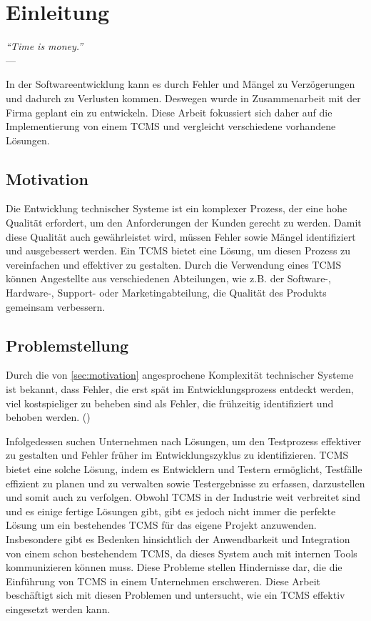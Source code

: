 \documentclass[a4paper, fontsize=11pt, parskip=half, twoside]{scrreprt}
\begin{document}
	
	
	\clearpage
	\chapter{Einleitung}
	
	\begin{flushright}
		\rightskip=8cm\textit{``Time is money.''} \\
		\vspace{.2em}
		\rightskip=6cm--- \textcite{franklin_advice_1748}
	\end{flushright}

	In der Softwareentwicklung kann es durch Fehler und Mängel zu Verzögerungen und dadurch zu Verlusten kommen.
	Deswegen wurde in Zusammenarbeit mit der Firma  geplant ein  zu entwickeln.
	Diese Arbeit fokussiert sich daher auf die Implementierung von einem \ac{TCMS} und vergleicht verschiedene vorhandene Lösungen.
	
	
	\section{Motivation} \label{sec:motivation}
	Die Entwicklung technischer Systeme ist ein komplexer Prozess, der eine hohe Qualität erfordert, um den Anforderungen der Kunden gerecht zu werden. 
	Damit diese Qualität auch gewährleistet wird, müssen Fehler sowie Mängel identifiziert und ausgebessert werden. 
	Ein \ac{TCMS} bietet eine Lösung, um diesen Prozess zu vereinfachen und effektiver zu gestalten. 
	Durch die Verwendung eines \ac{TCMS} können Angestellte aus verschiedenen Abteilungen, wie z.B. der Software-, Hardware-, Support- oder Marketingabteilung, die Qualität des Produkts gemeinsam verbessern. 
	
	\section{Problemstellung}
	Durch die von \autoref{sec:motivation} angesprochene Komplexität technischer Systeme ist bekannt, dass Fehler, die erst spät im Entwicklungsprozess entdeckt werden, viel kostspieliger zu beheben sind als Fehler, die frühzeitig identifiziert und behoben werden. (\textcite{westland_cost_2002})
	
	Infolgedessen suchen Unternehmen nach Lösungen, um den Testprozess effektiver zu gestalten und Fehler früher im Entwicklungszyklus zu identifizieren. 
	\ac{TCMS} bietet eine solche Lösung, indem es Entwicklern und Testern ermöglicht, Testfälle effizient zu planen und zu verwalten sowie Testergebnisse zu erfassen, darzustellen und somit auch zu verfolgen. 
	Obwohl \ac{TCMS} in der Industrie weit verbreitet sind und es einige fertige Lösungen gibt, gibt es jedoch nicht immer die perfekte Lösung um ein bestehendes \ac{TCMS} für das eigene Projekt anzuwenden. 
	Insbesondere gibt es Bedenken hinsichtlich der Anwendbarkeit und Integration von einem schon bestehendem \ac{TCMS}, da dieses System auch mit internen Tools kommunizieren können muss.
	Diese Probleme stellen Hindernisse dar, die die Einführung von \ac{TCMS} in einem Unternehmen erschweren. 
	Diese Arbeit beschäftigt sich mit diesen Problemen und untersucht, wie ein \ac{TCMS} effektiv eingesetzt werden kann.
	
\end{document}
